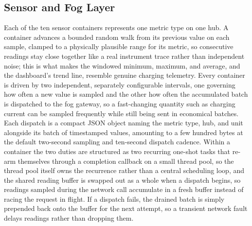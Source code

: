 \documentclass[conference]{IEEEtran}
\begin{document}
\subsection{Sensor and Fog Layer}

Each of the ten sensor containers represents one metric type on one hub. A container advances a bounded random walk from its previous value on each sample, clamped to a physically plausible range for its metric, so consecutive readings stay close together like a real instrument trace rather than independent noise; this is what makes the windowed minimum, maximum, and average, and the dashboard's trend line, resemble genuine charging telemetry. Every container is driven by two independent, separately configurable intervals, one governing how often a new value is sampled and the other how often the accumulated batch is dispatched to the fog gateway, so a fast-changing quantity such as charging current can be sampled frequently while still being sent in economical batches. Each dispatch is a compact JSON object naming the metric type, hub, and unit alongside its batch of timestamped values, amounting to a few hundred bytes at the default two-second sampling and ten-second dispatch cadence. Within a container the two duties are structured as two recurring one-shot tasks that re-arm themselves through a completion callback on a small thread pool, so the thread pool itself owns the recurrence rather than a central scheduling loop, and the shared reading buffer is swapped out as a whole when a dispatch begins, so readings sampled during the network call accumulate in a fresh buffer instead of racing the request in flight. If a dispatch fails, the drained batch is simply prepended back onto the buffer for the next attempt, so a transient network fault delays readings rather than dropping them.
\end{document}
